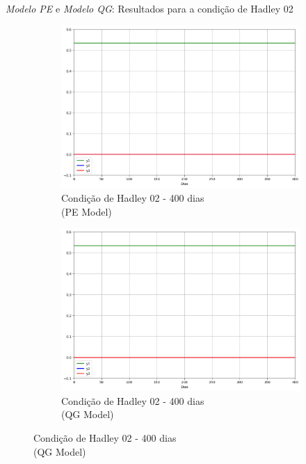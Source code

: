 \begin{frame}{\textit{Modelo PE} e \textit{Modelo QG}: Resultados para a condição de Hadley 02}
	\begin{figure}
		\centering
		\begin{subfigure}[b]{0.45\textwidth}
			\centering
			\includegraphics[width=\textwidth]{img/p03d400pe.png}
			\caption{Condição de Hadley 02 - 400 dias\\ (PE Model)}
			\label{fig:p03d400pe}
		\end{subfigure}
		\hfill
		\begin{subfigure}[b]{0.45\textwidth}
			\centering
			\includegraphics[width=\textwidth]{img/p03d400qg.png}
			\caption{Condição de Hadley 02 - 400 dias\\ (QG Model)}
			\label{fig:p03d400qg}
		\end{subfigure}
	\end{figure}
\end{frame}

